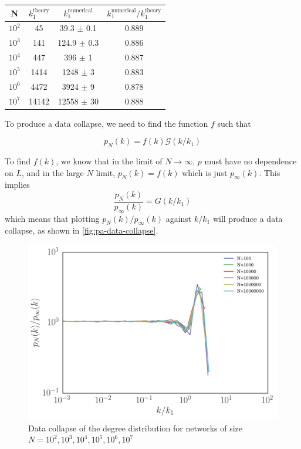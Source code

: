 \begin{center}
\begin{tabular}{ ||c | c | c | c ||}
\hline
N & $k_1^{\text{theory}}$ & $k_1^{\text{numerical}}$ & $k_1^{\text{numerical}} / k_1^{\text{theory}} $\\ 
\hline
$10^2$ & 45    & 39.3  $\pm$ 0.1 & 0.889 \\  
$10^3$ & 141   & 124.9 $\pm$ 0.3 & 0.886 \\
$10^4$ & 447   & 396   $\pm$  1  & 0.887 \\
$10^5$ & 1414  & 1248  $\pm$  3  & 0.883 \\
$10^6$ & 4472  & 3924  $\pm$  9  & 0.878 \\
$10^7$ & 14142 & 12558 $\pm$ 30  & 0.888 \\  
\hline
\end{tabular}
\label{table:pa-numerical-theoretical-ratio}
\end{center}


To produce a data collapse, we need to find the function $f$ such that 

\begin{equation}
	p_N(k) = f(k) \mathcal{G}\left ( k / k_1 \right )
	\label{eq:data-collapse}
\end{equation}

To find $f(k)$, we know that in the limit of $N \rightarrow \infty$, $p$ must have no dependence on $L$, and in the large $N$ limit, $p_N(k) = f(k)$ which is just $p_{\infty}(k)$. This implies 
\begin{equation}
	\frac{p_N(k)}{p_{\infty}(k)} = G \left ( k / k_1 \right )
\end{equation}
which means that plotting $p_N(k) / p_{\infty}(k)$ against $k / k_1$ will produce a data collapse, as shown in \autoref{fig:pa-data-collapse}. 

\begin{figure}
    \centering
    \includegraphics[height=0.5\linewidth]{img/pa-data-collapse}
    \caption{Data collapse of the degree distribution for networks of size $N=10^2, 10^3, 10^4, 10^5, 10^6, 10^7$}
    \label{fig:pa-data-collapse}
\end{figure}